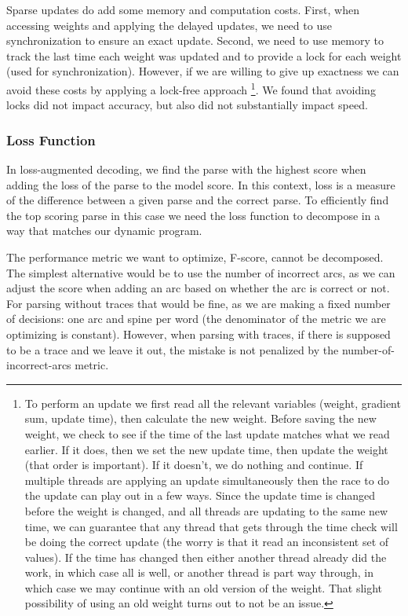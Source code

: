 Sparse updates do add some memory and computation costs.
First, when accessing weights and applying the delayed updates, we need to use synchronization to ensure an exact update.
Second, we need to use memory to track the last time each weight was updated and to provide a lock for each weight (used for synchronization).
However, if we are willing to give up exactness we can avoid these costs by applying a lock-free approach \parencite{hogwild}\footnote{
To perform an update we first read all the relevant variables (weight, gradient sum, update time), then calculate the new weight.
Before saving the new weight, we check to see if the time of the last update matches what we read earlier.
If it does, then we set the new update time, then update the weight (that order is important).
If it doesn't, we do nothing and continue.
If multiple threads are applying an update simultaneously then the race to do the update can play out in a few ways.
Since the update time is changed before the weight is changed, and all threads are updating to the same new time, we can guarantee that any thread that gets through the time check will be doing the correct update (the worry is that it read an inconsistent set of values).
If the time has changed then either another thread already did the work, in which case all is well, or another thread is part way through, in which case we may continue with an old version of the weight.
That slight possibility of using an old weight turns out to not be an issue.
}.
We found that avoiding locks did not impact accuracy, but also did not substantially impact speed.

\subsubsection{Loss Function}

In loss-augmented decoding, we find the parse with the highest score when adding the loss of the parse to the model score.
In this context, loss is a measure of the difference between a given parse and the correct parse.
To efficiently find the top scoring parse in this case we need the loss function to decompose in a way that matches our dynamic program.

The performance metric we want to optimize, F-score, cannot be decomposed.
The simplest alternative would be to use the number of incorrect arcs, as we can adjust the score when adding an arc based on whether the arc is correct or not.
For parsing without traces that would be fine, as we are making a fixed number of decisions: one arc and spine per word (\myie the denominator of the metric we are optimizing is constant).
However, when parsing with traces, if there is supposed to be a trace and we leave it out, the mistake is not penalized by the number-of-incorrect-arcs metric.

